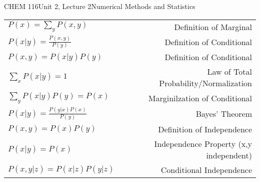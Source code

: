 \documentclass{article}
\begin{document}
\begin{tdoc}{CHEM 116}{Unit 2, Lecture 2}{Numerical Methods and Statistics}
  \begin{tabular}{lr}
    $P(x) = \sum_y P(x,y)$ & Definition of Marginal\vspace{0.15cm}\\
    $P(x|y) = \frac{P(x,y)}{P(y)}$ & Definition of Conditional\vspace{0.15cm}\\
    $P(x,y) = P(x|y)P(y)$ & Definition of Conditional\vspace{0.15cm}\\
    $\sum_x P(x|y) = 1$ & Law of Total Probability/Normalization\vspace{0.15cm}\\
    $\sum_y P(x|y)P(y) = P(x)$ & Marginilzation of Conditional\vspace{0.15cm}\\
    $P(x|y) = \frac{P(y|x)P(x)}{P(y)}$ & Bayes' Theorem\vspace{0.15cm}\\
    $P(x,y) = P(x)P(y)$ & Definition of Independence\vspace{0.15cm}\\
    $P(x | y) = P(x)$ & Independence Property (x,y independent)\vspace{0.15cm}\\
    $P(x,y | z) = P(x|z)P(y|z)$ & Conditional Independence\vspace{0.15cm}\\
  \end{tabular}

\end{tdoc}
\end{document}
